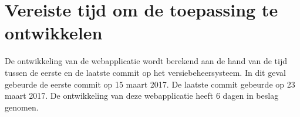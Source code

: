 \section{Vereiste tijd om de toepassing te ontwikkelen}
De ontwikkeling van de webapplicatie wordt berekend aan de hand van de tijd tussen de eerste en de laatste commit op het
versiebeheersysteem. In dit geval gebeurde de eerste commit op 15 maart 2017. De laatste commit gebeurde op 23 maart 2017.
De ontwikkeling van deze webapplicatie heeft 6 dagen in beslag genomen.
